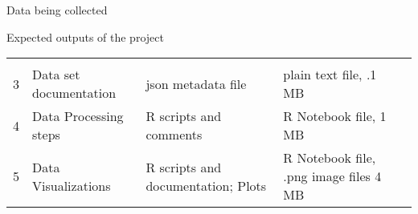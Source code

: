 \documentclass[ignorenonframetext,]{beamer}
\begin{document}
\begin{frame}[fragile]
\begin{block}{Data being collected}
\begin{block}{Expected outputs of the project}
\begin{longtable}[]{@{}cllll@{}}
\begin{minipage}[t]{0.18\columnwidth}
\strut
\end{minipage}\tabularnewline
\begin{minipage}[t]{0.11\columnwidth}\centering\strut
3\strut
\end{minipage} & \begin{minipage}[t]{0.11\columnwidth}\raggedright\strut
Data set documentation\strut
\end{minipage} & \begin{minipage}[t]{0.16\columnwidth}\raggedright\strut
json metadata file\strut
\end{minipage} & \begin{minipage}[t]{0.14\columnwidth}\raggedright\strut
plain text file, .1 MB\strut
\end{minipage} & \begin{minipage}[t]{0.18\columnwidth}\raggedright\strut
\strut
\end{minipage}\tabularnewline
\begin{minipage}[t]{0.11\columnwidth}\centering\strut
4\strut
\end{minipage} & \begin{minipage}[t]{0.11\columnwidth}\raggedright\strut
Data Processing steps\strut
\end{minipage} & \begin{minipage}[t]{0.16\columnwidth}\raggedright\strut
R scripts and comments\strut
\end{minipage} & \begin{minipage}[t]{0.14\columnwidth}\raggedright\strut
R Notebook file, 1 MB\strut
\end{minipage} & \begin{minipage}[t]{0.18\columnwidth}\raggedright\strut
\strut
\end{minipage}\tabularnewline
\begin{minipage}[t]{0.11\columnwidth}\centering\strut
5\strut
\end{minipage} & \begin{minipage}[t]{0.11\columnwidth}\raggedright\strut
Data Visualizations\strut
\end{minipage} & \begin{minipage}[t]{0.16\columnwidth}\raggedright\strut
R scripts and documentation; Plots\strut
\end{minipage} & \begin{minipage}[t]{0.14\columnwidth}\raggedright\strut
R Notebook file, .png image files 4 MB\strut
\end{minipage} & \begin{minipage}[t]{0.18\columnwidth}\raggedright\strut

\end{minipage}
\end{longtable}
\end{block}
\end{block}
\end{frame}
\end{document}
